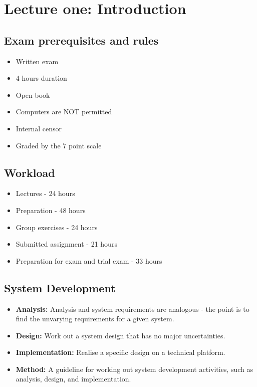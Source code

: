 \chapter{Lecture one: Introduction}

\section{Exam prerequisites and rules}

\begin{itemize}
    \item Written exam
    \item 4 hours duration
    \item Open book
    \item Computers are NOT permitted
    \item Internal censor
    \item Graded by the 7 point scale
\end{itemize}

\section{Workload}
\begin{itemize}
    \item Lectures - 24 hours
    \item Preparation - 48 hours
    \item Group exercises - 24 hours
    \item Submitted assignment - 21 hours
    \item Preparation for exam and trial exam - 33 hours
\end{itemize}

\section{System Development}
\begin{itemize}
    \item \textbf{Analysis:} Analysis and system requirements are analogous - the point is to find the unvarying requirements for a given system.
    \item \textbf{Design:} Work out a system design that has no major uncertainties.
    \item \textbf{Implementation:} Realise a specific design on a technical platform.
    \item \textbf{Method:} A guideline for working out system development activities, such as analysis, design, and implementation.
\end{itemize}

